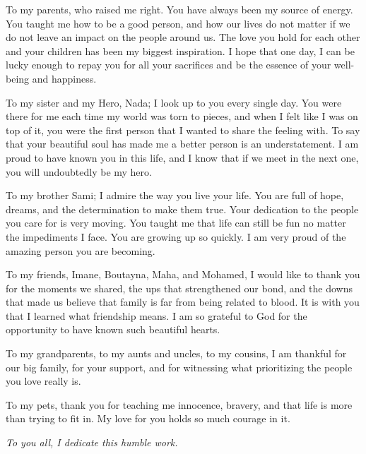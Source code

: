 


To my parents, who raised me right. You have always been my source of energy. You taught me how to be a good person, and how our lives do not matter if we do not leave an impact on the people around us. The love you hold for each other and your children has been my biggest inspiration.
I hope that one day, I can be lucky enough to repay you for all your sacrifices and be the essence of your well-being and happiness. 
\vspace*{0.4cm}

To my sister and my Hero, Nada; I look up to you every single day. You were there for me each time my world was torn to pieces, and when I felt like I was on top of it, you were the first person that I wanted to share the feeling with. To say that your beautiful soul has made me a better person is an understatement. I am proud to have known you in this life, and I know that if we meet in the next one, you will undoubtedly be my hero.
\vspace*{0.15cm}

To my brother Sami; I admire the way you live your life. You are full of hope, dreams, and the determination to make them true. Your dedication to the people you care for is very moving. You taught me that life can still be fun no matter the impediments I face. You are growing up so quickly. I am very proud of the amazing person you are becoming.
\vspace*{0.15cm}

To my friends, Imane, Boutayna, Maha, and Mohamed, I would like to thank you for the moments we shared, the ups that strengthened our bond, and the downs that made us believe that family is far from being related to blood. It is with you that I learned what friendship means. I am so grateful to God for the opportunity to have known such beautiful hearts. 
\vspace*{0.4cm}

To my grandparents, to my aunts and uncles, to my cousins, I am thankful for our big family, for your support, and for witnessing what prioritizing the people you love really is.
\vspace*{0.4cm}

To my pets, thank you for teaching me innocence, bravery, and that life is more than trying to fit in. My love for you holds so much courage in it. 

\bigskip
\medskip
\begin{center}
\large{
\textit{\uppercase{T}o you all, I dedicate this humble work. \\[5pt]}
}

\end{center}
\
\medskip



\clearpage